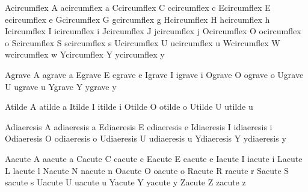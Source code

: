 
\startencoding[raw]

 Acircumflex {A}  acircumflex {a}
 Ccircumflex {C}  ccircumflex {c} 
 Ecircumflex {E}  ecircumflex {e}
 Gcircumflex {G}  gcircumflex {g}
 Hcircumflex {H}  hcircumflex {h}
 Icircumflex {I}  icircumflex {i}
 Jcircumflex {J}  jcircumflex {j}
 Ocircumflex {O}  ocircumflex {o}
 Scircumflex {S}  scircumflex {s}
 Ucircumflex {U}  ucircumflex {u}
 Wcircumflex {W}  wcircumflex {w}
 Ycircumflex {Y}  ycircumflex {y}
     
 Agrave {A}  agrave {a}
 Egrave {E}  egrave {e}
 Igrave {I}  igrave {i}
 Ograve {O}  ograve {o}
 Ugrave {U}  ugrave {u}
 Ygrave {Y}  ygrave {y}

 Atilde {A}  atilde {a}
 Itilde {I}  itilde {i}
 Otilde {O}  otilde {o}
 Utilde {U}  utilde {u}

 Adiaeresis {A}  adiaeresis {a}
 Ediaeresis {E}  ediaeresis {e}
 Idiaeresis {I}  idiaeresis {i}
 Odiaeresis {O}  odiaeresis {o}
 Udiaeresis {U}  udiaeresis {u}
 Ydiaeresis {Y}  ydiaeresis {y}

 Aacute {A}  aacute {a}
 Cacute {C}  cacute {c}
 Eacute {E}  eacute {e}
 Iacute {I}  iacute {i}
 Lacute {L}  lacute {l}
 Nacute {N}  nacute {n}
 Oacute {O}  oacute {o}
 Racute {R}  racute {r}
 Sacute {S}  sacute {s}
 Uacute {U}  uacute {u}
 Yacute {Y}  yacute {y}
 Zacute {Z}  zacute {z}

